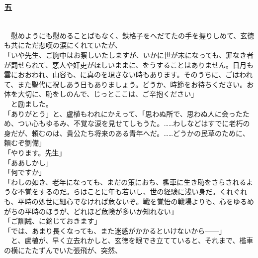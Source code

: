 \documentclass[
  paper=a5,
  fontsize=10pt,
  jafontsize=9.5pt,
  tate,                  %
  open_bracket_pos=nibu, %
]{jlreq}
\begin{document}
\subsubsection{五}

\\


　慰めようにも慰めることばもなく、鉄格子をへだてたの手を握りしめて、玄徳も共にただ悲嘆の涙にくれていたが、\\


「いや先生、ご胸中はお察しいたしますが、いかに世が末になっても、罪なき者が罰せられて、悪人や奸吏がほしいままに、をうすることはありません。日月も雲におおわれ、山容も、に真のを現さない時もあります。そのうちに、ごはわれて、また聖代に祝しあう日もありましょう。どうか、時節をお待ちください。お体を大切に、恥をしのんで、じっとここは、ご辛抱ください」\\


　と励ました。\\


「ありがとう」と、盧植もわれにかえって、「思わぬ所で、思わぬ人に会ったため、つい心もゆるみ、不覚な涙を見せてしもうた。……わしなどはすでに老朽の身だが、頼むのは、貴公たち将来のある青年へだ。……どうかの民草のために、頼むぞ劉備」\\


「やります。先生」\\


「ああしかし」\\


「何ですか」\\


「わしの如き、老年になっても、まだの策におち、檻車に生き恥をさらされるような不覚をするのだ。らはことに年も若いし、世の経験に浅い身だ。くれぐれも、平時の処世に細心でなければ危ないぞ。戦を覚悟の戦場よりも、心をゆるめがちの平時のほうが、どれほど危険が多いか知れない」\\


「ご訓誡、に銘じておきます」\\


「では、あまり長くなっても、また迷惑がかかるといけないから――」\\


　と、盧植が、早く立去れかしと、玄徳を眼でき立てていると、それまで、檻車の横にたたずんでいた張飛が、突然、\\
\end{document}
